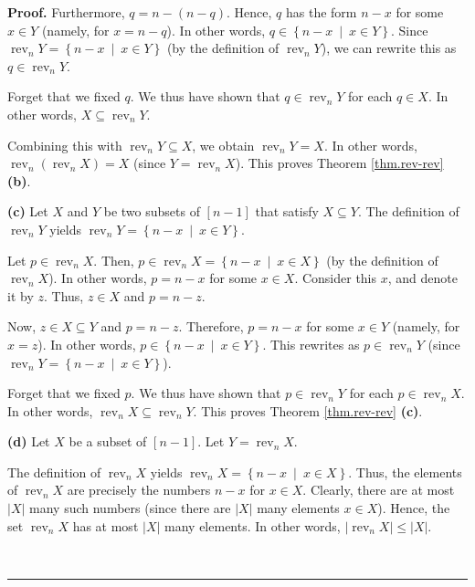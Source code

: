 \documentclass[numbers=enddot,12pt,final,onecolumn,notitlepage]{scrartcl}%
\theoremstyle{definition}
\newenvironment{proof}[1][Proof]{\noindent\textbf{#1.} }{\ \rule{0.5em}{0.5em}}
\begin{document}
\begin{proof}
Furthermore, $q=n-\left(  n-q\right)  $. Hence, $q$ has the form $n-x$ for
some $x\in Y$ (namely, for $x=n-q$). In other words, $q\in\left\{
n-x\ \mid\ x\in Y\right\}  $. Since $\operatorname*{rev}\nolimits_{n}%
Y=\left\{  n-x\ \mid\ x\in Y\right\}  $ (by the definition of
$\operatorname*{rev}\nolimits_{n}Y$), we can rewrite this as $q\in
\operatorname*{rev}\nolimits_{n}Y$.

Forget that we fixed $q$. We thus have shown that $q\in\operatorname*{rev}%
\nolimits_{n}Y$ for each $q\in X$. In other words, $X\subseteq
\operatorname*{rev}\nolimits_{n}Y$.

Combining this with $\operatorname*{rev}\nolimits_{n}Y\subseteq X$, we obtain
$\operatorname*{rev}\nolimits_{n}Y=X$. In other words, $\operatorname*{rev}%
\nolimits_{n}\left(  \operatorname*{rev}\nolimits_{n}X\right)  =X$ (since
$Y=\operatorname*{rev}\nolimits_{n}X$). This proves Theorem \ref{thm.rev-rev}
\textbf{(b)}. \medskip

\textbf{(c)} Let $X$ and $Y$ be two subsets of $\left[  n-1\right]  $ that
satisfy $X\subseteq Y$. The definition of $\operatorname*{rev}\nolimits_{n}Y$
yields $\operatorname*{rev}\nolimits_{n}Y=\left\{  n-x\ \mid\ x\in Y\right\}
$.

Let $p\in\operatorname*{rev}\nolimits_{n}X$. Then, $p\in\operatorname*{rev}%
\nolimits_{n}X=\left\{  n-x\ \mid\ x\in X\right\}  $ (by the definition of
$\operatorname*{rev}\nolimits_{n}X$). In other words, $p=n-x$ for some $x\in
X$. Consider this $x$, and denote it by $z$. Thus, $z\in X$ and $p=n-z$.

Now, $z\in X\subseteq Y$ and $p=n-z$. Therefore, $p=n-x$ for some $x\in Y$
(namely, for $x=z$). In other words, $p\in\left\{  n-x\ \mid\ x\in Y\right\}
$. This rewrites as $p\in\operatorname*{rev}\nolimits_{n}Y$ (since
$\operatorname*{rev}\nolimits_{n}Y=\left\{  n-x\ \mid\ x\in Y\right\}  $).

Forget that we fixed $p$. We thus have shown that $p\in\operatorname*{rev}%
\nolimits_{n}Y$ for each $p\in\operatorname*{rev}\nolimits_{n}X$. In other
words, $\operatorname*{rev}\nolimits_{n}X\subseteq\operatorname*{rev}%
\nolimits_{n}Y$. This proves Theorem \ref{thm.rev-rev} \textbf{(c)}. \medskip

\textbf{(d)} Let $X$ be a subset of $\left[  n-1\right]  $. Let
$Y=\operatorname*{rev}\nolimits_{n}X$.

The definition of $\operatorname*{rev}\nolimits_{n}X$ yields
$\operatorname*{rev}\nolimits_{n}X=\left\{  n-x\ \mid\ x\in X\right\}  $.
Thus, the elements of $\operatorname*{rev}\nolimits_{n}X$ are precisely the
numbers $n-x$ for $x\in X$. Clearly, there are at most $\left\vert
X\right\vert $ many such numbers (since there are $\left\vert X\right\vert $
many elements $x\in X$). Hence, the set $\operatorname*{rev}\nolimits_{n}X$
has at most $\left\vert X\right\vert $ many elements. In other words,
$\left\vert \operatorname*{rev}\nolimits_{n}X\right\vert \leq\left\vert
X\right\vert $.


\end{proof}
\end{document}
